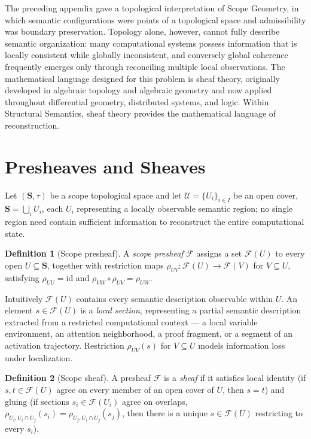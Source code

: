 \documentclass[11pt,twoside,openright]{book}
\numberwithin{equation}{chapter}
\theoremstyle{definition}
\newtheorem{definition}{Definition}[chapter]
\theoremstyle{plain}
\theoremstyle{remark}
\theoremstyle{definition}
\newcommand{\Scope}{\mathbf{S}}
\begin{document}
The preceding appendix gave a topological interpretation of Scope
Geometry, in which semantic configurations were points of a topological
space and admissibility was boundary preservation. Topology alone,
however, cannot fully describe semantic organization: many computational
systems possess information that is locally consistent while globally
inconsistent, and conversely global coherence frequently emerges only
through reconciling multiple local observations. The mathematical
language designed for this problem is sheaf theory, originally developed
in algebraic topology and algebraic geometry and now applied throughout
differential geometry, distributed systems, and logic. Within Structural
Semantics, sheaf theory provides the mathematical language of
reconstruction.

\section{Presheaves and Sheaves}

Let $(\Scope,\tau)$ be a scope topological space and let
$\mathcal{U}=\{U_i\}_{i\in I}$ be an open cover, $\Scope=\bigcup_i U_i$,
each $U_i$ representing a locally observable semantic region; no single
region need contain sufficient information to reconstruct the entire
computational state.

\begin{definition}[Scope presheaf]
A \emph{scope presheaf} $\mathcal{F}$ assigns a set $\mathcal{F}(U)$ to
every open $U\subseteq\Scope$, together with restriction maps
$\rho_{UV}:\mathcal{F}(U)\to\mathcal{F}(V)$ for $V\subseteq U$, satisfying
$\rho_{UU}=\mathrm{id}$ and $\rho_{VW}\circ\rho_{UV}=\rho_{UW}$.
\end{definition}

Intuitively $\mathcal{F}(U)$ contains every semantic description
observable within $U$. An element $s\in\mathcal{F}(U)$ is a \emph{local
section}, representing a partial semantic description extracted from a
restricted computational context --- a local variable environment, an
attention neighborhood, a proof fragment, or a segment of an activation
trajectory. Restriction $\rho_{UV}(s)$ for $V\subseteq U$ models
information loss under localization.

\begin{definition}[Scope sheaf]
A presheaf $\mathcal{F}$ is a \emph{sheaf} if it satisfies local identity
(if $s,t\in\mathcal{F}(U)$ agree on every member of an open cover of $U$,
then $s=t$) and gluing (if sections $s_i\in\mathcal{F}(U_i)$ agree on
overlaps, $\rho_{U_i,U_i\cap U_j}(s_i)=\rho_{U_j,U_i\cap U_j}(s_j)$, then
there is a unique $s\in\mathcal{F}(U)$ restricting to every $s_i$).
\end{definition}
\end{document}
